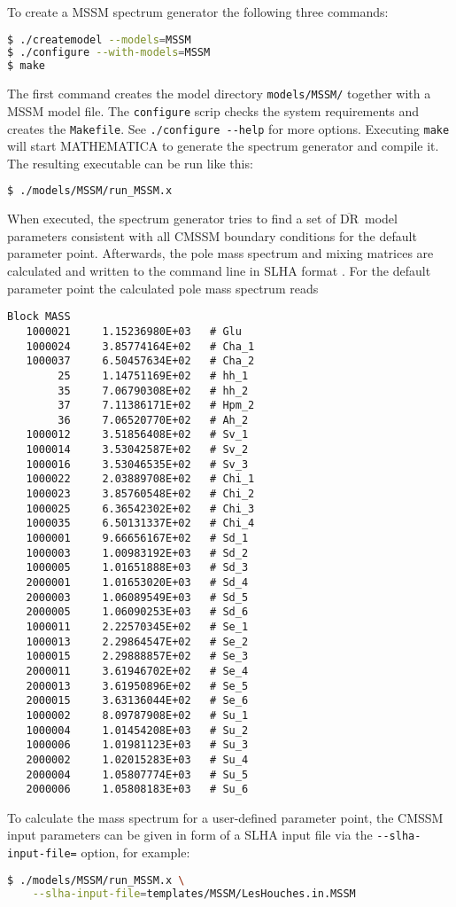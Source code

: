 \documentclass[final,3p,11pt,pdflatex]{elsarticle}
\newcommand{\code}[1]{\lstinline|#1|}  %
\newcommand{\textoverline}[1]{$\overline{\mbox{#1}}$}
\newcommand{\DRbar}{\textoverline{DR}\xspace}
\begin{document}
To create a MSSM spectrum generator the following three commands:
%
\begin{lstlisting}[language=bash]
$ ./createmodel --models=MSSM
$ ./configure --with-models=MSSM
$ make
\end{lstlisting}%
%
The first command creates the model directory \code{models/MSSM/}
together with a MSSM model file.  The \code{configure} scrip checks
the system requirements and creates the \code{Makefile}.  See
\code{./configure --help} for more options.  Executing \code{make}
will start MATHEMATICA to generate the spectrum generator and compile
it.  The resulting executable can be run like this:
\begin{lstlisting}[language=bash]
$ ./models/MSSM/run_MSSM.x
\end{lstlisting}%
%
When executed, the spectrum generator tries to find a set of \DRbar\
model parameters consistent with all CMSSM boundary conditions for the
default parameter point.  Afterwards, the pole mass spectrum and
mixing matrices are calculated and written to the command line in SLHA
format \cite{Skands:2003cj,Allanach:2008qq}.  For the default
parameter point the calculated pole mass spectrum reads
%
\begin{lstlisting}
Block MASS
   1000021     1.15236980E+03   # Glu
   1000024     3.85774164E+02   # Cha_1
   1000037     6.50457634E+02   # Cha_2
        25     1.14751169E+02   # hh_1
        35     7.06790308E+02   # hh_2
        37     7.11386171E+02   # Hpm_2
        36     7.06520770E+02   # Ah_2
   1000012     3.51856408E+02   # Sv_1
   1000014     3.53042587E+02   # Sv_2
   1000016     3.53046535E+02   # Sv_3
   1000022     2.03889708E+02   # Chi_1
   1000023     3.85760548E+02   # Chi_2
   1000025     6.36542302E+02   # Chi_3
   1000035     6.50131337E+02   # Chi_4
   1000001     9.66656167E+02   # Sd_1
   1000003     1.00983192E+03   # Sd_2
   1000005     1.01651888E+03   # Sd_3
   2000001     1.01653020E+03   # Sd_4
   2000003     1.06089549E+03   # Sd_5
   2000005     1.06090253E+03   # Sd_6
   1000011     2.22570345E+02   # Se_1
   1000013     2.29864547E+02   # Se_2
   1000015     2.29888857E+02   # Se_3
   2000011     3.61946702E+02   # Se_4
   2000013     3.61950896E+02   # Se_5
   2000015     3.63136044E+02   # Se_6
   1000002     8.09787908E+02   # Su_1
   1000004     1.01454208E+03   # Su_2
   1000006     1.01981123E+03   # Su_3
   2000002     1.02015283E+03   # Su_4
   2000004     1.05807774E+03   # Su_5
   2000006     1.05808183E+03   # Su_6
\end{lstlisting}
%
To calculate the mass spectrum for a user-defined parameter point, the
CMSSM input parameters can be given in form of a SLHA input file via
the \code{--slha-input-file=} option, for example:
%
\begin{lstlisting}[language=bash]
$ ./models/MSSM/run_MSSM.x \
    --slha-input-file=templates/MSSM/LesHouches.in.MSSM
\end{lstlisting}%
\end{document}
